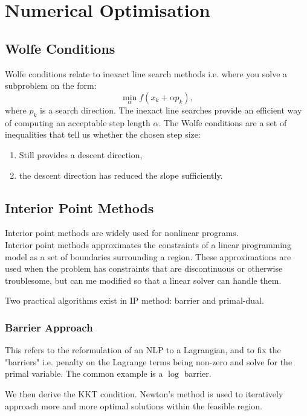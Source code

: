 \chapter{Numerical Optimisation}
\localtableofcontents

\section{Wolfe Conditions}

Wolfe conditions relate to inexact line search methods i.e.
where you solve a subproblem on the form:
\[
\min_\alpha f(x_k + \alpha p_k),
\]
where $p_k$ is a search direction. The inexact line searches provide
an efficient way of computing an acceptable step length $\alpha$.
The Wolfe conditions are a set of inequalities that tell us whether
the chosen step size:
\begin{enumerate}
    \item Still provides a descent direction,
    \item the descent direction has reduced the slope sufficiently.
\end{enumerate}

\section{Interior Point Methods}

Interior point methods are widely used for nonlinear programs.\\

Interior point methods approximates the constraints of a linear
programming model as a set of boundaries surrounding a region.
These approximations are used when the problem has constraints
that are discontinuous or otherwise troublesome, but can me
modified so that a linear solver can handle them. 

Two practical algorithms exist in IP method: barrier and
primal-dual.

\subsection{Barrier Approach}

This refers to the reformulation of an NLP to a Lagrangian,
and to fix the "barriers" i.e. penalty on the Lagrange terms 
being non-zero and solve for the primal variable. The common
example is a $\log$ barrier.

We then derive the KKT condition. Newton's
method is used to iteratively approach more and more optimal
solutions within the feasible region.\\


